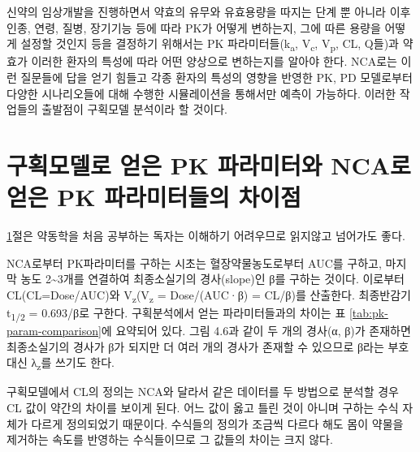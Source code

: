 \documentclass[
  11pt,
  krantz2, a4paper, twoside]{krantz}
\theoremstyle{definition}
\theoremstyle{definition}
\theoremstyle{definition}
\theoremstyle{definition}
\theoremstyle{remark}
\begin{document}
신약의 임상개발을 진행하면서 약효의 유무와 유효용량을 따지는 단계 뿐
아니라 이후 인종, 연령, 질병, 장기기능 등에 따라 PK가 어떻게 변하는지,
그에 따른 용량을 어떻게 설정할 것인지 등을 결정하기 위해서는 PK
파라미터들(k\textsubscript{a}, V\textsubscript{c}, V\textsubscript{p}, CL, Q들)과 약효가 이러한 환자의 특성에 따라 어떤
양상으로 변하는지를 알아야 한다. NCA로는 이런 질문들에 답을 얻기 힘들고
각종 환자의 특성의 영향을 반영한 PK, PD 모델로부터 다양한
시나리오들에 대해 수행한 시뮬레이션을 통해서만 예측이 가능하다. 이러한
작업들의 출발점이 구획모델 분석이라 할 것이다.

\hypertarget{diff-pk-param}{%
\section{구획모델로 얻은 PK 파라미터와 NCA로 얻은 PK 파라미터들의 차이점}\label{diff-pk-param}}

\ref{diff-pk-param}절은 약동학을 처음 공부하는 독자는 이해하기 어려우므로 읽지않고
넘어가도 좋다.

NCA로부터 PK파라미터를 구하는 시초는 혈장약물농도로부터 AUC를 구하고, 마지막 농도 2\textasciitilde3개를 연결하여 최종소실기의 경사(slope)인 β를 구하는 것이다. 이로부터 CL(CL=Dose/AUC)와 V\textsubscript{z}(V\textsubscript{z} = Dose/(AUC·β) = CL/β)를 산출한다. 최종반감기 t\textsubscript{1/2} = 0.693/β로 구한다. 구획분석에서 얻는 파라미터들과의 차이는 표 \ref{tab:pk-param-comparison}에 요약되어 있다.
그림 4.6과 같이 두 개의 경사(α, β)가 존재하면 최종소실기의 경사가 β가 되지만 더 여러 개의 경사가 존재할 수 있으므로 β라는 부호 대신 λ\textsubscript{z}를 쓰기도 한다.


구획모델에서 CL의 정의는 NCA와 달라서 같은 데이터를 두 방법으로 분석할 경우 CL 값이 약간의 차이를 보이게 된다. 어느 값이 옳고 틀린 것이 아니며 구하는 수식 자체가 다르게 정의되었기 때문이다.
수식들의 정의가 조금씩 다르다 해도 몸이 약물을 제거하는 속도를 반영하는 수식들이므로 그 값들의 차이는 크지 않다.

\tiny
\end{document}
